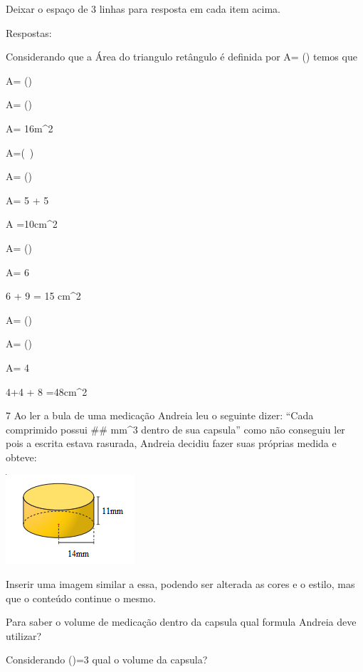 Deixar o espaço de 3 linhas para resposta em cada item acima.

Respostas:

Considerando que a Área do triangulo retângulo é definida por A=
() temos que

\item 

A= ()

A= ()

A= 16m^2

\item 

A=(\ )

A= ()

A= 5 + 5

A =10cm^2

\item 

A= ()

A= 6

6 + 9 = 15 cm^2

\item 

A= ()

A= ()

A= 4

4+4 + 8 =48cm^2

\num{7} Ao ler a bula de uma medicação Andreia leu o seguinte dizer: ``Cada
comprimido possui \#\# mm^3 dentro de sua capsula'' como não conseguiu
ler pois a escrita estava rasurada, Andreia decidiu fazer suas próprias
medida e obteve:

\includegraphics[width=1\times 88542in,height=1\times 3125in]{./imgSAEB_8_MAT/media/image50.png}

Inserir uma imagem similar a essa, podendo ser alterada as cores e o
estilo, mas que o conteúdo continue o mesmo.

\item Para saber o volume de medicação dentro da capsula qual formula
Andreia deve utilizar?

\item Considerando (\Pi)=3 qual o volume da capsula?

